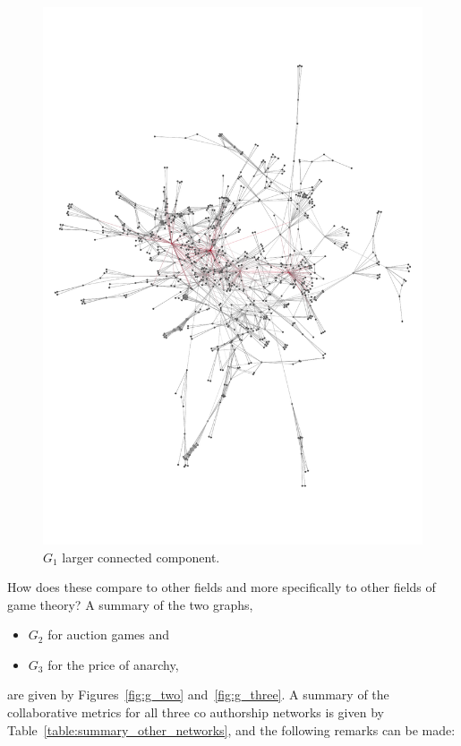 \documentclass{article}
\theoremstyle{definition}
\begin{document}
\begin{figure}[!hbtp]
\begin{minipage}{.45\textwidth}
        \includegraphics[width=.9\textwidth]{./assets/pd_network_cluster.pdf}
        \caption{\(G_1\) larger connected component.}\label{fig:g_one_cluster}
    \end{minipage}
\end{figure}

How does these compare to other fields and more specifically to other fields of
game theory? A summary of the two graphs,

\begin{itemize}
    \item \(G_2\) for auction games and
    \item \(G_3\) for the price of anarchy,
\end{itemize}

are given by Figures~\ref{fig:g_two} and~\ref{fig:g_three}.
A summary of the collaborative metrics for all three co authorship networks is given by
Table~\ref{table:summary_other_networks}, and the following remarks can be made:
\end{document}
